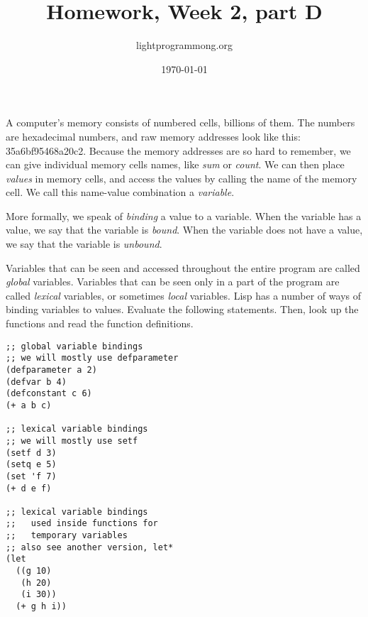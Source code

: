 \documentclass{article}
\title{Homework, Week 2, part D}
\author{lightprogrammong.org}
\date{\today}
\begin{document}
\maketitle{}

A computer's memory consists of numbered cells, billions of them. The numbers are hexadecimal numbers, and raw memory addresses look like this: 35a6bf95468a20c2. Because the memory addresses are so hard to remember, we can give individual memory cells names, like \textit{sum} or \textit{count}. We can then place \textit{values} in memory cells, and access the values by calling the name of the memory cell. We call this name-value combination a \textit{variable}.

More formally, we speak of \textit{binding} a value to a variable. When the variable has a value, we say that the variable is \textit{bound}. When the variable does not have a value, we say that the variable is \textit{unbound}.

Variables that can be seen and accessed throughout the entire program are called \textit{global} variables. Variables that can be seen only in a part of the program are called \textit{lexical} variables, or sometimes \textit{local} variables. Lisp has a number of ways of binding variables to values. Evaluate the following statements. Then, look up the functions and read the function definitions.
\lstset{language=Lisp,numbers=left,keepspaces=true,basicstyle=\small,numberstyle=\tiny,showstringspaces=false,breaklines=true}
\begin{lstlisting}
;; global variable bindings
;; we will mostly use defparameter
(defparameter a 2)
(defvar b 4)
(defconstant c 6)
(+ a b c)

;; lexical variable bindings
;; we will mostly use setf
(setf d 3)
(setq e 5)
(set 'f 7)
(+ d e f)

;; lexical variable bindings
;;   used inside functions for
;;   temporary variables
;; also see another version, let*
(let 
  ((g 10)
   (h 20)
   (i 30))
  (+ g h i)) 
\end{lstlisting}
\end{document}
